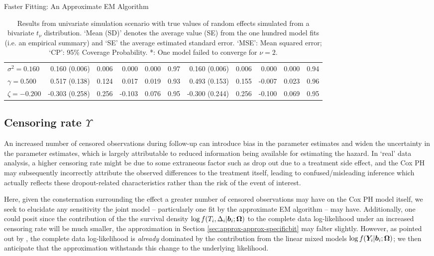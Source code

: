 \begin{chapter}{\label{cha:approx}Faster Fitting: An Approximate EM Algorithm}
\begin{table}[t]
\begin{tabular}{l|rrrrr:rrrrr}
    $\sigma^2 = 0.160$ &  0.160 (0.006) & 0.006 &  0.000 & 0.000 & 0.97 &  0.160 (0.006) & 0.006 &  0.000 & 0.000 & 0.94 \\ 
    $\gamma = 0.500$ &  0.517 (0.138) & 0.124 &  0.017 & 0.019 & 0.93 &  0.493 (0.153) & 0.155 & -0.007 & 0.023 & 0.96 \\ 
    $\zeta = -0.200$ & -0.303 (0.258) & 0.256 & -0.103 & 0.076 & 0.95 & -0.300 (0.244) & 0.256 & -0.100 & 0.069 & 0.95 \\ 
     \hline
  \end{tabular}
  \caption{Results from univariate simulation scenario with true values of random effects simulated from a bivariate $t_\nu$ distribution. `Mean (SD)' denotes the average value (SE) from the one hundred model fits (i.e. an empirical summary) and `SE' the average estimated standard error. `MSE': Mean squared error; `CP': 95\% Coverage Probability. *: One model failed to converge for $\nu=2$.}
  \label{tab:approx-sens-t-results}
  \end{table}

  \subsection{Censoring rate \texorpdfstring{$\Upsilon$}{censrate}}\label{sec:approx-sens-C}
  An increased number of censored observations during follow-up can introduce bias in the parameter estimates and widen the uncertainty in the parameter estimates, which is largely attributable to reduced information being available for estimating the hazard. In `real' data analysis, a higher censoring rate might be due to some extraneous factor such as drop out due to a treatment side effect, and the Cox PH may subsequently incorrectly attribute the observed differences to the treatment itself, leading to confused/misleading inference which actually reflects these dropout-related characteristics rather than the risk of the event of interest.

  Here, given the consternation surrounding the effect a greater number of censored observations may have on the Cox PH model itself, we seek to elucidate any sensitivity the joint model -- particularly one fit by the approximate EM algorithm -- may have. Additionally, one could posit since the contribution of the the survival density $\log f\!\left( T_i,\Delta_i|\bm{b}_i;\bm{\mathrm{\Omega}}\right)$ to the complete data log-likelihood under an increased censoring rate will be much smaller, the approximation in Section \ref{sec:approx-approx-specificbit} may falter slightly. However, as pointed out by \citet{Rizopoulos2012}, the complete data log-likelihood is \textit{already} dominated by the contribution from the linear mixed models $\log f\!\left(\bm{Y}_i|\bm{b}_i;\bm{\mathrm{\Omega}}\right)$; we then anticipate that the approximation withstands this change to the underlying likelihood.


\end{chapter}
